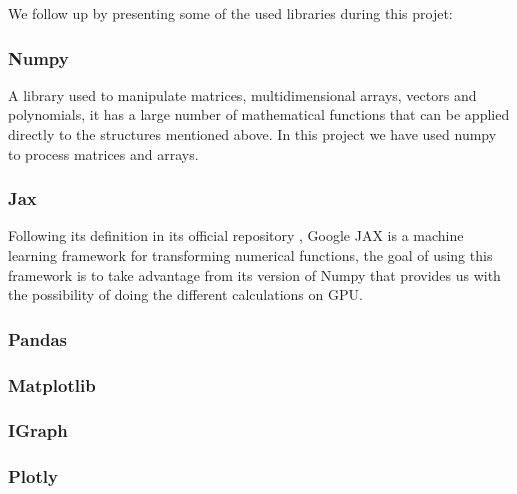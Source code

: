 We follow up by presenting some of the used libraries during this projet:

\subsubsection{Numpy}
A library used to manipulate matrices, multidimensional arrays, vectors and
polynomials, it has a large number of mathematical functions that can be applied
directly to the structures mentioned above. In this project we have used numpy
to process matrices and arrays.

\subsubsection{Jax}
Following its definition in its official repository \citep{jax_2022}, Google JAX
is a machine learning framework for transforming numerical functions, the goal
of using this framework is to take advantage from its version of Numpy that
provides us with the possibility of doing the different calculations on GPU.

\subsubsection{Pandas}

\subsubsection{Matplotlib}

\subsubsection{IGraph}

\subsubsection{Plotly}



